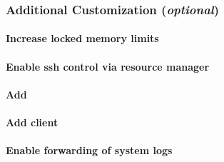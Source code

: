 \documentclass[letterpaper]{article}
\begin{document}



\subsubsection{Additional Customization ({\em optional})} \label{sec:addl_customizations}


\paragraph{Increase locked memory limits}


\paragraph{Enable ssh control via resource manager} 


\paragraph{Add \beegfs{}} \label{sec:add_beegfs}


\paragraph{Add \Lustre{} client} \label{sec:lustre_client}




\paragraph{Enable forwarding of system logs} \label{sec:add_syslog}

\end{document}
